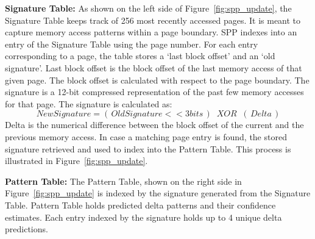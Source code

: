 \noindent \textbf{Signature Table:} As shown on the left side of
Figure~\ref{fig:spp_update}, the Signature Table keeps track of 256
most recently accessed pages. It is meant to capture memory access
patterns within a page boundary. SPP indexes into an entry of the
Signature Table using the page number. For each entry corresponding to
a page, the table stores a `last block offset' and an `old
signature'. Last block offset is the block offset of the last memory
access of that given page. The block offset is calculated with respect
to the page boundary. The signature is a 12-bit compressed
representation of the past few memory accesses for that page. The
signature is calculated as:
$$New Signature = (\,Old Signature << 3 bits\,) \;\;XOR\;\;
(\,Delta\,)$$ Delta is the numerical difference between the block
offset of the current and the previous memory access. In case a
matching page entry is found, the stored signature retrieved and used
to index into the Pattern Table.  This process is illustrated in
Figure~\ref{fig:spp_update}.

\noindent \textbf{Pattern Table:} The Pattern Table, shown on the right
side in Figure~\ref{fig:spp_update} is indexed by the signature
generated from the Signature Table.  Pattern Table holds predicted
delta patterns and their confidence estimates. Each entry indexed by
the signature holds up to 4 unique delta predictions.



